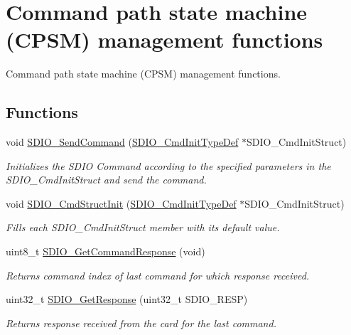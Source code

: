 \hypertarget{group___s_d_i_o___group2}{}\section{Command path state machine (C\+P\+S\+M) management functions}
\label{group___s_d_i_o___group2}


Command path state machine (C\+P\+S\+M) management functions.  


\subsection*{Functions}
\begin{DoxyCompactItemize}
\item 
void \hyperlink{group___s_d_i_o___group2_ga7117d2f702703f6c0a66bc07707cab23}{S\+D\+I\+O\+\_\+\+Send\+Command} (\hyperlink{struct_s_d_i_o___cmd_init_type_def}{S\+D\+I\+O\+\_\+\+Cmd\+Init\+Type\+Def} $\ast$S\+D\+I\+O\+\_\+\+Cmd\+Init\+Struct)
\begin{DoxyCompactList}\small\item\em Initializes the S\+D\+I\+O Command according to the specified parameters in the S\+D\+I\+O\+\_\+\+Cmd\+Init\+Struct and send the command. \end{DoxyCompactList}\item 
void \hyperlink{group___s_d_i_o___group2_ga09d9e89f49c87c82aec79c97b7068e24}{S\+D\+I\+O\+\_\+\+Cmd\+Struct\+Init} (\hyperlink{struct_s_d_i_o___cmd_init_type_def}{S\+D\+I\+O\+\_\+\+Cmd\+Init\+Type\+Def} $\ast$S\+D\+I\+O\+\_\+\+Cmd\+Init\+Struct)
\begin{DoxyCompactList}\small\item\em Fills each S\+D\+I\+O\+\_\+\+Cmd\+Init\+Struct member with its default value. \end{DoxyCompactList}\item 
uint8\+\_\+t \hyperlink{group___s_d_i_o___group2_ga9badf271c818e09da301d715c4ad0e5b}{S\+D\+I\+O\+\_\+\+Get\+Command\+Response} (void)
\begin{DoxyCompactList}\small\item\em Returns command index of last command for which response received. \end{DoxyCompactList}\item 
uint32\+\_\+t \hyperlink{group___s_d_i_o___group2_ga5c1e859511840e8cca6a9a768bce220b}{S\+D\+I\+O\+\_\+\+Get\+Response} (uint32\+\_\+t S\+D\+I\+O\+\_\+\+R\+E\+S\+P)
\begin{DoxyCompactList}\small\item\em Returns response received from the card for the last command. \end{DoxyCompactList}\end{DoxyCompactItemize}


